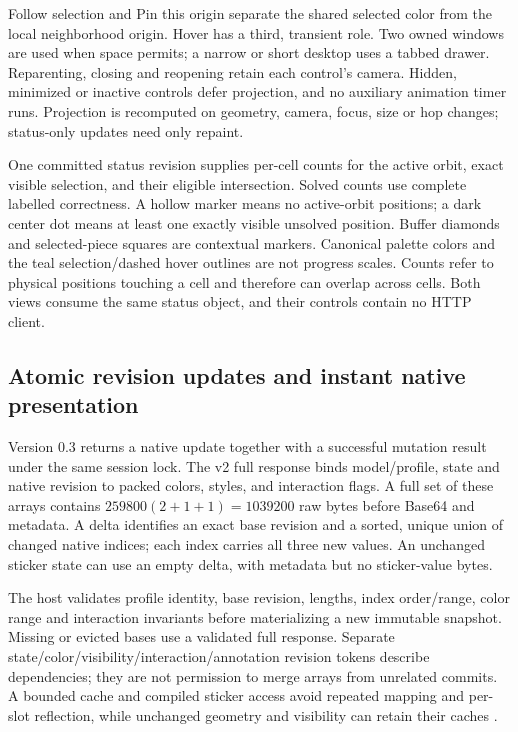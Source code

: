 \documentclass[a4paper,11pt]{article}
\begin{document}
Follow selection and Pin this origin separate the shared selected color from the local neighborhood origin. Hover has a third, transient role. Two owned windows are used when space permits; a narrow or short desktop uses a tabbed drawer. Reparenting, closing and reopening retain each control's camera. Hidden, minimized or inactive controls defer projection, and no auxiliary animation timer runs. Projection is recomputed on geometry, camera, focus, size or hop changes; status-only updates need only repaint.

One committed status revision supplies per-cell counts for the active orbit, exact visible selection, and their eligible intersection. Solved counts use complete labelled correctness. A hollow marker means no active-orbit positions; a dark center dot means at least one exactly visible unsolved position. Buffer diamonds and selected-piece squares are contextual markers. Canonical palette colors and the teal selection/dashed hover outlines are not progress scales. Counts refer to physical positions touching a cell and therefore can overlap across cells. Both views consume the same status object, and their controls contain no HTTP client.

\subsection{Atomic revision updates and instant native presentation}

Version 0.3 returns a native update together with a successful mutation result under the same session lock. The v2 full response binds model/profile, state and native revision to packed colors, styles, and interaction flags. A full set of these arrays contains \(259800(2+1+1)=1039200\) raw bytes before Base64 and metadata. A delta identifies an exact base revision and a sorted, unique union of changed native indices; each index carries all three new values. An unchanged sticker state can use an empty delta, with metadata but no sticker-value bytes.

The host validates profile identity, base revision, lengths, index order/range, color range and interaction invariants before materializing a new immutable snapshot. Missing or evicted bases use a validated full response. Separate state/color/visibility/interaction/annotation revision tokens describe dependencies; they are not permission to merge arrays from unrelated commits. A bounded cache and compiled sticker access avoid repeated mapping and per-slot reflection, while unchanged geometry and visibility can retain their caches \cite{performance03,source03}.
\end{document}
